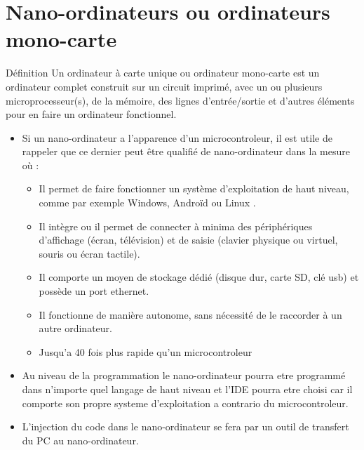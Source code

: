 \documentclass{beamer}
\begin{document}
\section{Nano-ordinateurs ou ordinateurs mono-carte}

\begin{frame}
 \begin{block}{Définition}
 Un ordinateur à carte unique ou ordinateur mono-carte est un ordinateur complet construit sur un circuit imprimé,
 avec un ou plusieurs microprocesseur(s), de la mémoire, des lignes d'entrée/sortie et d'autres éléments pour en faire un ordinateur fonctionnel. 
 \end{block}
\end{frame}
\begin{frame}
\begin{itemize}
\item Si un nano-ordinateur a l’apparence d’un microcontroleur, il est utile de rappeler que ce dernier peut être qualifié de nano-ordinateur dans la mesure où :
\begin{itemize}
    \item Il permet de faire fonctionner un système d’exploitation de haut niveau, comme par exemple Windows, Androïd ou Linux .
    \item Il intègre ou il permet de connecter à minima des périphériques d’affichage (écran, télévision) et de saisie (clavier physique ou virtuel, souris ou écran tactile).
    \item Il comporte un moyen de stockage dédié (disque dur, carte SD, clé usb) et possède un port ethernet.
    \item Il fonctionne de manière autonome, sans nécessité de le raccorder à un autre ordinateur.
   \item Jusqu'a 40 fois plus rapide qu'un microcontroleur
\end{itemize}
\end{itemize}
\end{frame} 
\begin{frame}
\begin{itemize}
    \item Au niveau de la programmation le nano-ordinateur pourra etre programmé dans n'importe quel langage de haut niveau et l'IDE pourra etre choisi car il comporte son propre systeme d'exploitation a contrario du microcontroleur.
    \item L'injection du code dans le nano-ordinateur se fera par un outil de transfert du PC au nano-ordinateur.
\end{itemize}
\end{frame}
\end{document}
